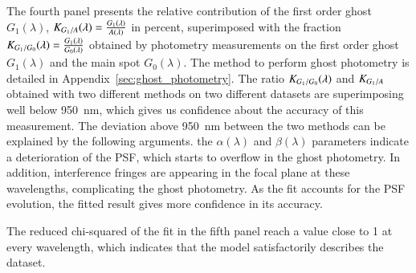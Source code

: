 The fourth panel presents the relative contribution of the first order ghost $G_1(\lambda)$, $K_{G_1/A}(\lambda) = \frac{G_1(\lambda)}{A(\lambda)}$ in percent, superimposed with the fraction $K_{G_1/G_0}(\lambda)=\frac{G_1(\lambda)}{G_0(\lambda)}$ obtained by photometry measurements on the first order ghost $G_1(\lambda)$ and the main spot $G_0(\lambda)$. The method to perform ghost photometry is detailed in Appendix~\ref{sec:ghost_photometry}. The ratio $K_{G_1/G_0}(\lambda)$ and $K_{G_1/A}$ obtained with two different methods on two different datasets are superimposing well below \SI{950}{\nano\meter}, which gives us confidence about the accuracy of this measurement. The deviation above \SI{950}{\nano\meter} between the two methods can be explained by the following arguments. the $\alpha(\lambda)$ and $\beta(\lambda)$ parameters indicate a deterioration of the PSF, which starts to overflow in the ghost photometry. In addition, interference fringes are appearing in the focal plane at these wavelengths, complicating the ghost photometry. As the fit accounts for the PSF evolution, the fitted result gives more confidence in its accuracy.

The reduced chi-squared of the fit in the fifth panel reach a value close to 1 at every wavelength, which indicates that the model satisfactorily describes the dataset.

